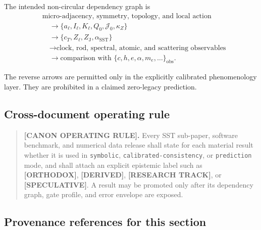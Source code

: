 \documentclass[11pt]{article}
\theoremstyle{definition}
\theoremstyle{plain}
\theoremstyle{remark}
\begin{document}
The intended non-circular dependency graph is
\begin{align}
    &\text{micro-adjacency, symmetry, topology, and local action}
    \nonumber\\
    &\quad\longrightarrow
    \{a_\ell,I_\ell,K_\ell,Q_0,\mathcal J_0,\kappa_Z\}
    \nonumber\\
    &\quad\longrightarrow
    \{c_T,Z_\ell,Z_{\mathrm J},\alpha_{\mathrm{SST}}\}
    \nonumber\\
    &\quad\longrightarrow
    \text{clock, rod, spectral, atomic, and scattering observables}
    \nonumber\\
    &\quad\longrightarrow
    \text{comparison with }\{c,h,e,\alpha,m_e,\ldots\}_{\mathrm{obs}}.
    \label{eq:canonical_zero_legacy_dependency_graph}
\end{align}

The reverse arrows are permitted only in the explicitly calibrated
phenomenology layer. They are prohibited in a claimed zero-legacy prediction.

\subsection{Cross-document operating rule}
\label{subsec:genesis_cross_document_operating_rule}

\begin{quote}
\textbf{[CANON OPERATING RULE].}
Every SST sub-paper, software benchmark, and numerical data release shall state
for each material result whether it is used in \texttt{symbolic},
\texttt{calibrated-consistency}, or \texttt{prediction} mode, and shall attach an
explicit epistemic label such as \textbf{[ORTHODOX]}, \textbf{[DERIVED]},
\textbf{[RESEARCH TRACK]}, or \textbf{[SPECULATIVE]}.  A result may be promoted
only after its dependency graph, gate profile, and error envelope are exposed.
\end{quote}

\subsection{Provenance references for this section}
\label{subsec:genesis_provenance_references}
\end{document}
